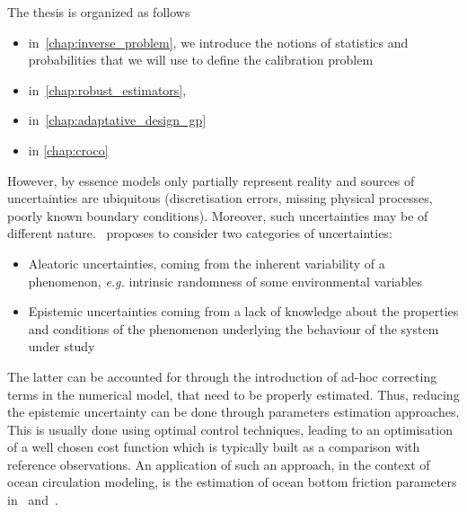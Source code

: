 \documentclass[../../Main_ManuscritThese.tex]{subfiles}
\begin{document}


The thesis is organized as follows
\begin{itemize}
\item in~\cref{chap:inverse_problem}, we introduce the notions of statistics and probabilities that we will use to define the calibration problem
\item in~\cref{chap:robust_estimators}, \cite{trappler_robust_2020-1}
\item in~\cref{chap:adaptative_design_gp}
\item in \cref{chap:croco} 
\end{itemize}




However, by essence models
only partially represent reality and sources of uncertainties are
ubiquitous (discretisation errors, missing physical processes, poorly
known boundary conditions). Moreover, such uncertainties may be of
different nature.~\cite{walker_defining_2003} proposes to consider two
categories of uncertainties:
\begin{itemize}
\item Aleatoric uncertainties, coming from the inherent variability of
a phenomenon, \emph{e.g.} intrinsic randomness of some environmental
variables
\item Epistemic uncertainties coming from a lack of knowledge about
the properties and conditions of the phenomenon underlying the
behaviour of the system under study
\end{itemize} The latter can be accounted for through the introduction
of ad-hoc correcting terms in the numerical model, that need to be
properly estimated. Thus, reducing the epistemic uncertainty can be
done through parameters estimation approaches. This is usually done
using optimal control techniques, leading to an optimisation of a well
chosen cost function which is typically built as a comparison with
reference observations.
  An application of such an approach, in the context of ocean
circulation modeling, is the estimation of ocean bottom friction
parameters in~\cite{das_estimation_1991}
and~\cite{boutet_estimation_2015}.

 
  
\end{document}
